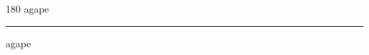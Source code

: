 
\begin{frame}
\begin{center}
\begin{turn}{180}
{\fontsize{2.5cm}{1em}\selectfont agape}
\end{turn}
\vspace{1em}\par  
\hrule
\vspace{1em}\par  
{\fontsize{2.5cm}{1em}\selectfont agape}
\end{center}
\end{frame}
